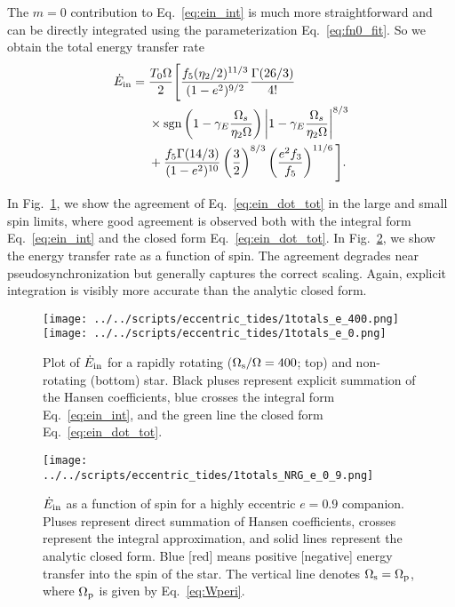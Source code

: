 \documentclass[
        fleqn,
        usenatbib,
    ]{mnras}
\newcommand*{\p}[1]{\left(#1\right)}
\begin{document}
The $m = 0$ contribution to Eq.~\eqref{eq:ein_int} is much more straightforward
and can be directly integrated using the parameterization
Eq.~\eqref{eq:fn0_fit}. So we obtain the total energy transfer rate
\begin{align}
    \dot{E}_{\rm in} ={}& \frac{T_0 \Omega}{2}\Bigg[\frac{f_5
        (\eta_2/2)^{11/3}}{(1-e^2)^{9/2}} \frac{\Gamma(26/3)}{4!}\nonumber\\
        &\times \mathrm{sgn}\p{1 - \gamma_E\frac{\Omega_s}{\eta_2 \Omega}}
            \left|1 - \gamma_E\frac{\Omega_s}{\eta_2 \Omega}\right|^{8/3}
            \nonumber\\
        &+
    \frac{f_5 \Gamma(14 / 3)}{(1 - e^2)^{10}} \left(\frac{3}{2}\right)^{8/3}
            \left(\frac{e^2 f_3}{f_5}\right)^{11/6}\Bigg].
            \label{eq:ein_dot_tot}
\end{align}

In Fig.~\ref{fig:e0}, we show the agreement of Eq.~\eqref{eq:ein_dot_tot} in the
large and small spin limits, where good agreement is observed both with the
integral form Eq.~\eqref{eq:ein_int} and the closed form
Eq.~\eqref{eq:ein_dot_tot}. In Fig.~\ref{fig:e_spin}, we show the energy
transfer rate as a function of spin. The agreement degrades near
pseudosynchronization but generally captures the correct scaling. Again,
explicit integration is visibly more accurate than the analytic closed form.
\begin{figure}
    \centering
    \texttt{[image: ../../scripts/eccentric\_tides/1totals\_e\_400.png]}
    \texttt{[image: ../../scripts/eccentric\_tides/1totals\_e\_0.png]}
    \caption{Plot of $\dot{E}_{\rm in}$ for a rapidly rotating ($\Omega_{\rm s}
    / \Omega = 400$; top) and non-rotating (bottom) star. Black pluses represent
    explicit summation of the Hansen coefficients, blue crosses the integral
    form Eq.~\eqref{eq:ein_int}, and the green line the closed form
    Eq.~\eqref{eq:ein_dot_tot}. }\label{fig:e0}
\end{figure}
\begin{figure}
    \centering
    \texttt{[image: ../../scripts/eccentric\_tides/1totals\_NRG\_e\_0\_9.png]}
    \caption{$\dot{E}_{\rm in}$ as a function of spin for a highly eccentric $e
    = 0.9$ companion. Pluses represent direct summation of Hansen coefficients,
    crosses represent the integral approximation, and solid lines represent the
    analytic closed form. Blue [red] means positive [negative] energy transfer
    into the spin of the star. The vertical line denotes $\Omega_{\rm s} =
    \Omega_{\rm p}$, where $\Omega_{\rm p}$ is given by Eq.~\eqref{eq:Wperi}.
    }\label{fig:e_spin}
\end{figure}
\end{document}
